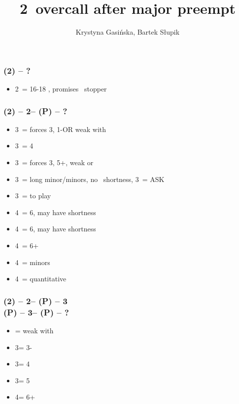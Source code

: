 \documentclass[12pt, a4paper]{article}
\title{2\ntx\ overcall after major preempt}
\author{Krystyna Gasińska, Bartek Słupik}
\begin{document}
\maketitle


\subsubsection*{(2\majs) -- ?}
\begin{itemize}
    \item 2\nt\ = 16-18 \bal, promises \majs\ stopper
\end{itemize}

\subsubsection*{(2\hearts) -- 2\nt -- (P) -- ?}
\begin{itemize}
    \item 3\clubs\ = forces 3\diams, 1-\hearts \gf OR weak with \diams
    \item 3\diams\ = 4\spades \gf
    \item 3\hearts\ = forces 3\spades, 5+\spades, weak or \gf
    \item 3\spades\ = long minor/minors, no \hearts\ shortness, 3\nt\ = ASK
    \item 3\nt\ = to play
    \item 4\clubs\ = 6\spades, may have shortness
    \item 4\diams\ = 6\spades, may have shortness
    \item 4\hearts\ = 6+\spades
    \item 4\spades\ = minors
    \item 4\nt\ = quantitative
\end{itemize}

\subsubsection*{(2\hearts) -- 2\nt -- (P) -- 3\clubs \\
                (P) -- 3\diams -- (P) -- ?}
\begin{itemize}
    \item \pass = weak with \diams
    \item 3\hearts = 3-\spades
    \item 3\spades = 4\spades
    \item 3\nt = 5\spades
    \item 4\clubs = 6+\spades
\end{itemize}
\end{document}
